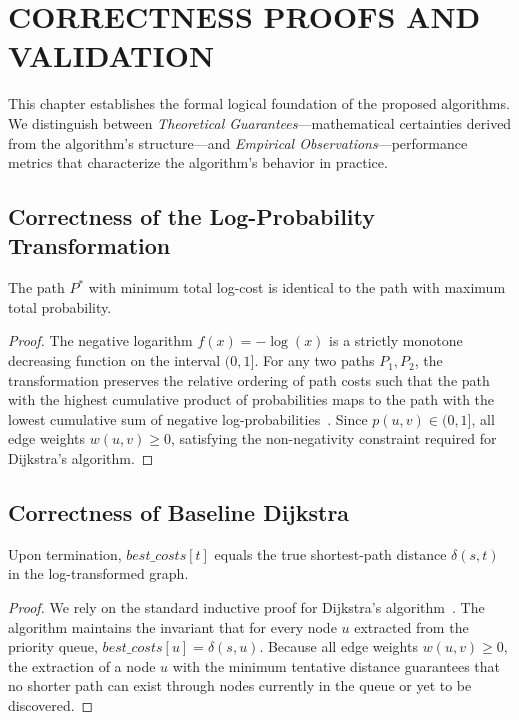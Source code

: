 \chapter{CORRECTNESS PROOFS AND VALIDATION}\label{chap:correctness}

This chapter establishes the formal logical foundation of the proposed algorithms. We distinguish between \textit{Theoretical Guarantees}—mathematical certainties derived from the algorithm's structure—and \textit{Empirical Observations}—performance metrics that characterize the algorithm's behavior in practice.

\section{Correctness of the Log-Probability Transformation}

\begin{theorem}\label{thm:log_transform}
The path $P^*$ with minimum total log-cost is identical to the path with maximum total probability.
\end{theorem}

\begin{proof}
The negative logarithm $f(x)=-\log(x)$ is a strictly monotone decreasing function on the interval $(0,1]$. For any two paths $P_1, P_2$, the transformation preserves the relative ordering of path costs such that the path with the highest cumulative product of probabilities maps to the path with the lowest cumulative sum of negative log-probabilities~\citep{manning1999nlp}. Since $p(u,v) \in (0,1]$, all edge weights $w(u,v) \geq 0$, satisfying the non-negativity constraint required for Dijkstra's algorithm.
\end{proof}

\section{Correctness of Baseline Dijkstra}

\begin{theorem}\label{thm:baseline_optimal}
Upon termination, $\mathit{best\_costs}[t]$ equals the true shortest-path distance $\delta(s,t)$ in the log-transformed graph.
\end{theorem}

\begin{proof}
We rely on the standard inductive proof for Dijkstra’s algorithm~\citep{cormen2009}. The algorithm maintains the invariant that for every node $u$ extracted from the priority queue, $\mathit{best\_costs}[u] = \delta(s,u)$. Because all edge weights $w(u,v) \geq 0$, the extraction of a node $u$ with the minimum tentative distance guarantees that no shorter path can exist through nodes currently in the queue or yet to be discovered. 
\end{proof}

